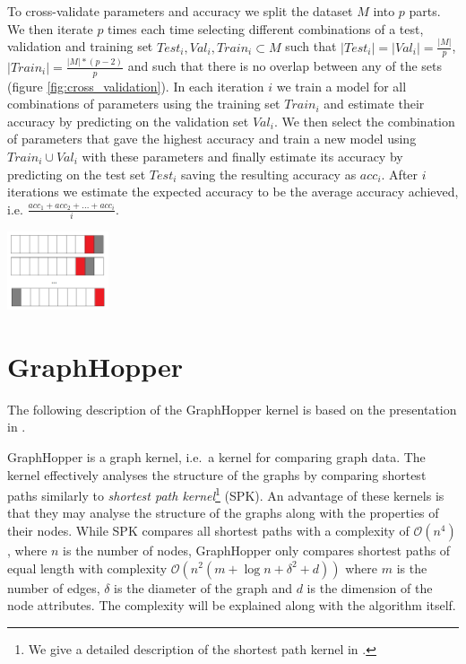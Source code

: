 \documentclass{article}
\begin{document}
\begin{minipage}{0.7\linewidth}
	To cross-validate parameters and accuracy we split the dataset $M$ into $p$ parts. We then iterate $p$ times each time selecting different combinations of a test, validation and training set $Test_i, Val_i, Train_i\subset M$ such that $|Test_i|=|Val_i|=\frac{|M|}{p}$,  $|Train_i| = \frac{|M| * (p-2)}{p}$ and such that there is no overlap between any of the sets (figure \ref{fig:cross_validation}). In each iteration $i$ we train a model for all combinations of parameters using the training set $Train_i$ and estimate their accuracy by predicting on the validation set $Val_i$. We then select the combination of parameters that gave the highest accuracy and train a new model using $Train_i\cup Val_i$ with these parameters and finally estimate its accuracy by predicting on the test set $Test_i$ saving the resulting accuracy as $acc_i$. After $i$ iterations we estimate the expected accuracy to be the average accuracy achieved, i.e. $\frac{acc_1 + acc_2 + ... + acc_i}{i}$.
\end{minipage}
\hspace{0.5cm}
\begin{minipage}[c]{0.3\linewidth}
	\centering
		\includegraphics[width=3cm]{10-fold-cross-validation_3}
		\label{fig:cross_validation}
\end{minipage}

\section{GraphHopper}
\label{section:graphhopper}
The following description of the GraphHopper kernel is based on the presentation in \cite{graphhopper}.

GraphHopper is a graph kernel, i.e.\ a kernel for comparing graph data. The kernel effectively analyses the structure of the graphs by comparing shortest paths similarly to \textit{shortest path kernel}\footnote{We give a detailed description of the shortest path kernel in \cite{svm-graph-kernels}.} (SPK)\cite{shortest-path}. An advantage of these kernels is that they may analyse the structure of the graphs along with the properties of their nodes.
While SPK compares all shortest paths with a complexity of $\mathcal{O}(n^4)$, where $n$ is the number of nodes, GraphHopper only compares shortest paths of equal length with complexity $\mathcal{O}(n^2(m+\log n+\delta^2 + d))$ where $m$ is the number of edges, $\delta$ is the diameter of the graph and $d$ is the dimension of the node attributes. The complexity will be explained along with the algorithm itself.
\end{document}
